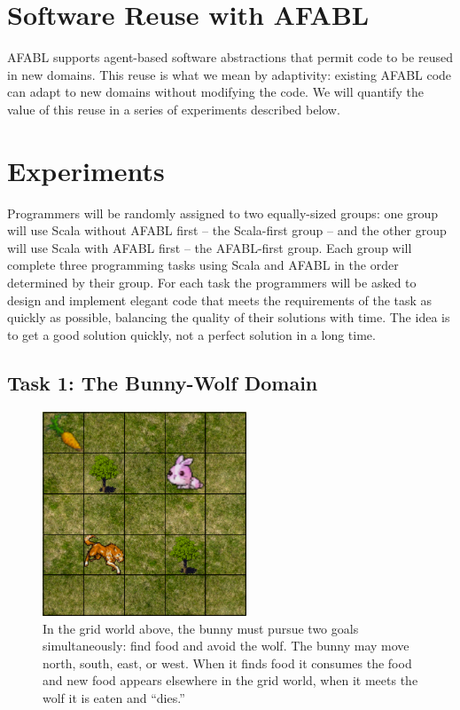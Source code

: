 \section{Software Reuse with AFABL}

AFABL supports agent-based software abstractions that permit code to be reused in new domains.  This reuse is what we mean by adaptivity: existing AFABL code can adapt to new domains without modifying the code.  We will quantify the value of this reuse in a series of
experiments described below.

\section{Experiments}

Programmers will be randomly assigned to two equally-sized groups: one group will use Scala without AFABL first -- the Scala-first group -- and the other group will use Scala with AFABL first -- the AFABL-first group.  Each group will complete three programming tasks using Scala and AFABL in the order determined by their group.  For each task the programmers will be asked to design and implement elegant code that meets the requirements of the task as quickly as possible, balancing the quality of their solutions with time.  The idea is to get a good solution quickly, not a perfect solution in a long time.

\subsection{Task 1: The Bunny-Wolf Domain}\label{sec:task1}

\begin{figure}[h]

\begin{center}
\includegraphics[height=2.4in]{bunny.png}
\end{center}


\caption{In the grid world above, the bunny must pursue two goals
  simultaneously: find food and avoid the wolf.  The bunny may move
  north, south, east, or west.  When it finds food it consumes the
  food and new food appears elsewhere in the grid world, when it meets
  the wolf it is eaten and ``dies.''}
\label{fig:bunny-picture}
\end{figure}


